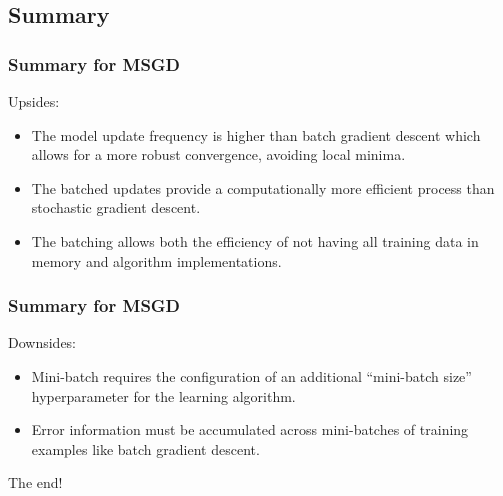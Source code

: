 \documentclass[cjk]{beamer}
\begin{document}
\subsection{Summary}
\begin{frame}
\frametitle{Summary for MSGD}
Upsides:
\begin{itemize}
	\item The model update frequency is higher than batch gradient descent which allows for a more robust convergence, avoiding local minima.
	\item The batched updates provide a computationally more efficient process than stochastic gradient descent.
	\item The batching allows both the efficiency of not having all training data in memory and algorithm implementations.
\end{itemize}
\end{frame}

\begin{frame}
\frametitle{Summary for MSGD}
Downsides:
\begin{itemize}
	\item Mini-batch requires the configuration of an additional “mini-batch size” hyperparameter for the learning algorithm.
	\item Error information must be accumulated across mini-batches of training examples like batch gradient descent.
\end{itemize}
\end{frame}

\begin{frame}
\begin{center}
\huge The end!
\end{center}
\end{frame}
%
\end{document}
